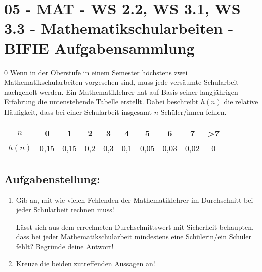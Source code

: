 \section{05 - MAT - WS 2.2, WS 3.1, WS 3.3 - Mathematikschularbeiten - BIFIE Aufgabensammlung}

\begin{langesbeispiel} \item[0] %
				Wenn in der Oberstufe in einem Semester höchstens zwei Mathematikschularbeiten vorgesehen sind, muss jede versäumte Schularbeit nachgeholt werden.
				Ein Mathematiklehrer hat auf Basis seiner langjährigen Erfahrung die untenstehende Tabelle erstellt. Dabei beschreibt $h(n)$ die relative Häufigkeit, dass bei einer Schularbeit insgesamt $n$ Schüler/innen fehlen. 
				\leer
				
\begin{center}
				\begin{tabular}{|c|c|c|c|c|c|c|c|c|c|} \hline
				$n$&0&1&2&3&4&5&6&7&>7\\ \hline
				$h(n)$&0,15&0,15&0,2&0,3&0,1&0,05&0,03&0,02&0\\ \hline
				\end{tabular}	
\end{center}
			

\subsection{Aufgabenstellung:}
\begin{enumerate}
	\item Gib an, mit wie vielen Fehlenden der Mathematiklehrer im Durchschnitt bei jeder Schularbeit rechnen muss!
	
	Lässt sich aus dem errechneten Durchschnittswert mit Sicherheit behaupten, dass bei jeder Mathematikschularbeit mindestens eine Schülerin/ein Schüler fehlt? Begründe deine Antwort!
	\item Kreuze die beiden zutreffenden Aussagen an!
					

\end{enumerate}
\end{langesbeispiel}
